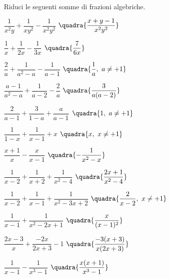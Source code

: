 \begin{esercizio}[\Ast]
\label{ese:19.28}
Riduci le seguenti somme di frazioni algebriche.
\begin{multicols}{2}
\begin{enumeratea}
 \item \(\dfrac{1}{x^{2}y}+\dfrac{1}{xy^{2}}-\dfrac{1}{x^{2}y^{2}}\)
  \hfill {\footnotesize \(\quadra{\dfrac{x+y-1}{x^{2}y^{2}}}\)}
 \item \(\dfrac{1}{x}+\dfrac{1}{2x}-\dfrac{1}{3x}\)
  \hfill {\footnotesize \(\quadra{\dfrac{7}{6x}}\)}
 \item \(\dfrac{2}{a}+\dfrac{1}{a^{{2}}-a}-\dfrac{1}{a-1}\)
  \hfill {\footnotesize \(\quadra{\dfrac{1}{a},~ a \neq +1}\)}
 \item \(\dfrac{a-1}{a^{2}-a}+\dfrac{1}{a-2}-\dfrac{2}{a}\)
  \hfill {\footnotesize \(\quadra{\dfrac{3}{a(a-2)}}\)}
 \item \(\dfrac{2}{a-1}+\dfrac{3}{1-a}+\dfrac{a}{a-1}\)
  \hfill {\footnotesize \(\quadra{1,~a \neq +1}\)}
 \item \(\dfrac{1}{1-x}+\dfrac{1}{x-1}+x\)
  \hfill {\footnotesize \(\quadra{x,~x \neq +1}\)}
 \item \(\dfrac{x+1}{x}-\dfrac{x}{x-1}\)
  \hfill {\footnotesize \(\quadra{-{\dfrac{1}{x^{2}-x}}}\)}
 \item \(\dfrac{1}{x-2}+\dfrac{1}{x+2}+\dfrac{1}{x^{{2}}-4}\)
  \hfill {\footnotesize \(\quadra{\dfrac{2x+1}{x^{2}-4}}\)}
 \item \(\dfrac{1}{x-2}+\dfrac{1}{x-1}+\dfrac{1}{x^{{2}}-3x+2}\)
  \hfill {\footnotesize \(\quadra{\dfrac{2}{x-2},~ x \neq +1}\)}
 \item \(\dfrac{1}{x-1}+\dfrac{1}{x^{2}-2x+1}\)
  \hfill {\footnotesize \(\quadra{\dfrac{x}{(x-1)^{2}}}\)}
 \item \(\dfrac{2x-3}{x}+\dfrac{-2x}{2x+3}-1\)
  \hfill {\footnotesize \(\quadra{\dfrac{-3(x+3)}{x(2x+3)}}\)}
 \item \(\dfrac{1}{x-1}-\dfrac{1}{x^{3}-1}\)
  \hfill {\footnotesize \(\quadra{\dfrac{x(x+1)}{x^{3}-1}}\)}
\end{enumeratea}
\end{multicols}
\end{esercizio}

